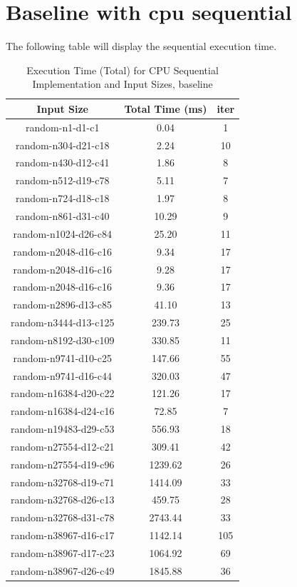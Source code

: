 \documentclass[letterpaper,12pt]{article}
\theoremstyle{remark}
\begin{document}
\section{Baseline with cpu sequential}
The following table will display the sequential execution time.
\begin{table}[ht]
\centering
\caption{Execution Time (Total) for CPU Sequential Implementation and Input Sizes, baseline}
\begin{tabular}{|c|c|c|}
\hline
\textbf{Input Size} & \textbf{Total Time (ms)} & iter \\
\hline
random-n1-d1-c1      & 0.04 & 1 \\
random-n304-d21-c18  & 2.24 & 10 \\
random-n430-d12-c41  & 1.86 & 8 \\
random-n512-d19-c78  & 5.11 & 7 \\
random-n724-d18-c18  & 1.97 & 8 \\
random-n861-d31-c40  & 10.29 & 9 \\
random-n1024-d26-c84 & 25.20 & 11 \\
random-n2048-d16-c16 & 9.34 & 17 \\
random-n2048-d16-c16 & 9.28 & 17 \\
random-n2048-d16-c16 & 9.36 & 17 \\
random-n2896-d13-c85 & 41.10 & 13 \\
random-n3444-d13-c125 & 239.73 & 25 \\
random-n8192-d30-c109 & 330.85 & 11 \\
random-n9741-d10-c25  & 147.66 & 55 \\
random-n9741-d16-c44  & 320.03 & 47 \\
random-n16384-d20-c22 & 121.26 & 17 \\
random-n16384-d24-c16 & 72.85 & 7 \\
random-n19483-d29-c53 & 556.93 & 18 \\
random-n27554-d12-c21 & 309.41 & 42 \\
random-n27554-d19-c96 & 1239.62 & 26 \\
random-n32768-d19-c71 & 1414.09 & 33 \\
random-n32768-d26-c13 & 459.75 & 28 \\
random-n32768-d31-c78 & 2743.44 & 33 \\
random-n38967-d16-c17 & 1142.14 & 105 \\
random-n38967-d17-c23 & 1064.92 & 69 \\
random-n38967-d26-c49 & 1845.88 & 36 \\

\end{tabular}
\end{table}
\end{document}
